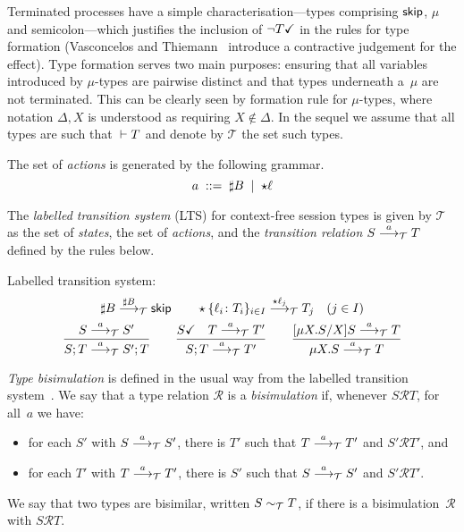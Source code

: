 Terminated processes have a simple characterisation---types comprising
$\skipk$, $\mu$ and semicolon---which justifies the inclusion of
$\neg\DONE T$ in the rules for type formation (Vasconcelos and
Thiemann~\cite{thiemann2016context} introduce a contractive judgement
for the effect).
%
Type formation serves two main purposes: ensuring that all variables
introduced by $\mu$-types are pairwise distinct and that types
underneath a~$\mu$ are not terminated. This can be clearly seen by
formation rule for $\mu$-types, where notation $\Delta,X$ is
understood as requiring $X\notin\Delta$.
%
In the sequel we assume that all types are such that $\isType[] T$ and
denote by $\mathcal{T}$ the set such types.

The set of \emph{actions} is generated by the following grammar.
\begin{equation*}
  a \grmeq \sharp B \grmor \star \ell
\end{equation*}

The \emph{labelled transition system} (LTS) for context-free session
types is given by $\mathcal{T}$ as the set of \emph{states}, the
set of \emph{actions}, and the \emph{transition relation}
$S\LTSderives T$ defined by the rules below.

\noindent Labelled transition system:\hfill{}
%
\begin{gather*}
  \sharp B \LTSderives[\sharp B] \skipk
  \qquad
  \star\{\ell_i\colon T_i\}_{i\in I} \LTSderives[\star \ell_j] T_j\quad
  (j\in I)
  \\
  \frac{S \LTSderives S'}{S; T \LTSderives S';T}
  \qquad
  \frac{\DONE{S} \quad T \LTSderives T'}{S; T \LTSderives T'}
  \qquad
  \frac{\subs{\mu X.S}{X}S \LTSderives T}{\mu X.S \LTSderives T}
\end{gather*}

\emph{Type bisimulation} is defined in the usual way from the labelled
transition system~\cite{sangiorgi2014introduction}.
%
We say that a type relation $\mathcal R$ is a \emph{bisimulation} if,
whenever $S\mathcal RT$, for all~$a$ we have:
%
\begin{itemize}
\item for each $S'$ with $S \LTSderives S'$, there is $T'$ such that $T
  \LTSderives T'$ and $S'\mathcal RT'$, and
\item for each $T'$ with $T \LTSderives T'$, there is $S'$ such that $S
  \LTSderives S'$ and $S'\mathcal RT'$.
\end{itemize}
%
We say that two types are bisimilar, written $S \bisim T$, if there
is a bisimulation~$\mathcal R$ with $S\mathcal RT$.

